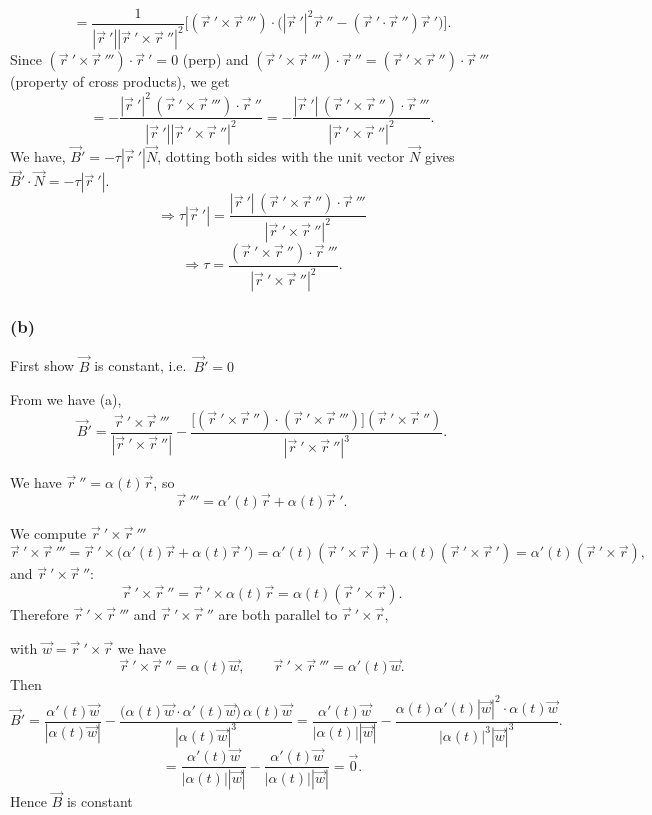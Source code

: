 \documentclass{article}
\begin{document}
\[
=
\frac{1}{|\vec{r}\ '||\vec{r}\ ' \times \vec{r}\ ''|^2}
\Big[
(\vec{r}\ ' \times \vec{r}\ ''') \cdot
\bigl(|\vec{r}\ '|^2 \vec{r}\ '' - (\vec{r}\ ' \cdot \vec{r}\ '')\vec{r}\ '\bigr)
\Big].
\]
Since $(\vec{r}\ ' \times \vec{r}\ ''') \cdot \vec{r}\ ' = 0$ (perp)
and $(\vec{r}\ ' \times \vec{r}\ ''') \cdot \vec{r}\ '' 
= (\vec{r}\ ' \times \vec{r}\ '') \cdot \vec{r}\ '''$ (property of cross products),
we get
\[
=
-\frac{|\vec{r}\ '|^2 \, (\vec{r}\ ' \times \vec{r}\ ''') \cdot \vec{r}\ ''}
{|\vec{r}\ '||\vec{r}\ ' \times \vec{r}\ ''|^2}
=
-\frac{|\vec{r}\ '| \, (\vec{r}\ ' \times \vec{r}\ '') \cdot \vec{r}\ '''}
{|\vec{r}\ ' \times \vec{r}\ ''|^2}.
\]
We have, $\vec{B}' = -\tau|\vec{r}\ '|\vec{N}$,
dotting both sides with the unit vector $\vec{N}$ gives
$\vec{B}' \cdot \vec{N} = -\tau|\vec{r}\ '|$. 
\[
\Rightarrow \tau|\vec{r}\ '|
=
\frac{|\vec{r}\ '| \, (\vec{r}\ ' \times \vec{r}\ '') \cdot \vec{r}\ '''}
{|\vec{r}\ ' \times \vec{r}\ ''|^2}
\]
\[
\Rightarrow
\tau
=
\frac{(\vec{r}\ ' \times \vec{r}\ '') \cdot \vec{r}\ '''}
{|\vec{r}\ ' \times \vec{r}\ ''|^2}.
\]


\subsubsection*{(b)}

First show $\vec{B}$ is constant, i.e.\ $\vec{B}' = 0$

From we have (a),
\[
\vec{B}' = \frac{\vec{r}\ ' \times \vec{r}\ '''}{|\vec{r}\ ' \times \vec{r}\ ''|}
- \frac{\bigl[(\vec{r}\ ' \times \vec{r}\ '') \cdot (\vec{r}\ ' \times \vec{r}\ ''')\bigr](\vec{r}\ ' \times \vec{r}\ '')}{|\vec{r}\ ' \times \vec{r}\ ''|^3}.
\]

We have $\vec{r}\ '' = \alpha(t)\vec{r}$, so
\[
\vec{r}\ ''' = \alpha'(t)\vec{r} + \alpha(t)\vec{r}\ '.
\]

We compute $\vec{r}\ ' \times \vec{r}\ '''$
\[
\vec{r}\ ' \times \vec{r}\ '''
= \vec{r}\ ' \times \bigl(\alpha'(t)\vec{r} + \alpha(t)\vec{r}\ '\bigr)
= \alpha'(t)(\vec{r}\ ' \times \vec{r}) + \alpha(t)(\vec{r}\ ' \times \vec{r}\ ')
= \alpha'(t)(\vec{r}\ ' \times \vec{r}),
\]
and $\vec{r}\ ' \times \vec{r}\ ''$:
\[
\vec{r}\ ' \times \vec{r}\ ''
= \vec{r}\ ' \times \alpha(t)\vec{r}
= \alpha(t)(\vec{r}\ ' \times \vec{r}).
\]
Therefore $\vec{r}\ ' \times \vec{r}\ '''$ and $\vec{r}\ ' \times \vec{r}\ ''$ are both parallel
to $\vec{r}\ ' \times \vec{r}$,

with $\vec{w} = \vec{r}\ ' \times \vec{r}$ we have
\[
\vec{r}\ ' \times \vec{r}\ '' = \alpha(t)\vec{w}, \qquad \vec{r}\ ' \times \vec{r}\ ''' = \alpha'(t)\vec{w}.
\]
Then
\[
\vec{B}'
= \frac{\alpha'(t)\vec{w}}{|\alpha(t)\vec{w}|}
- \frac{\bigl(\alpha(t)\vec{w} \cdot \alpha'(t)\vec{w}\bigr)\,\alpha(t)\vec{w}}{|\alpha(t)\vec{w}|^3}
= \frac{\alpha'(t)\vec{w}}{|\alpha(t)||\vec{w}|}
- \frac{\alpha(t)\alpha'(t)|\vec{w}|^2 \cdot \alpha(t)\vec{w}}{|\alpha(t)|^3|\vec{w}|^3}.
\]
\[
= \frac{\alpha'(t)\vec{w}}{|\alpha(t)||\vec{w}|}
- \frac{\alpha'(t)\vec{w}}{|\alpha(t)||\vec{w}|}
= \vec{0}.
\]
Hence $\vec{B}$ is constant
\\
\end{document}
